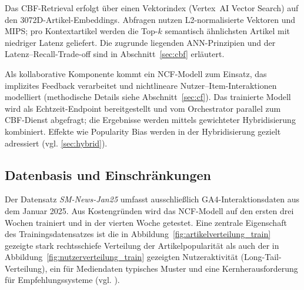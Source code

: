 \label{sec:cbf_service}
Das \ac{CBF}-Retrieval erfolgt über einen Vektorindex (Vertex~AI Vector Search) auf den 
3072D-Artikel-Embeddings. Abfragen nutzen L2-normalisierte Vektoren und \ac{MIPS}; 
pro Kontextartikel werden die Top-$k$ semantisch ähnlichsten Artikel mit niedriger Latenz 
geliefert. Die zugrunde liegenden \ac{ANN}-Prinzipien und der Latenz–Recall-Trade-off 
sind in Abschnitt~\ref{sec:cbf} erläutert.

\label{sec:ncf_service}
Als kollaborative Komponente kommt ein \ac{NCF}-Modell zum Einsatz, 
das implizites Feedback verarbeitet und nichtlineare 
Nutzer–Item-Interaktionen modelliert (methodische Details siehe Abschnitt~\ref{sec:cf}). 
Das trainierte Modell wird als Echtzeit-Endpoint bereitgestellt und vom 
Orchestrator parallel zum \ac{CBF}-Dienst abgefragt; die Ergebnisse werden mittels 
gewichteter Hybridisierung kombiniert. Effekte wie Popularity Bias werden in der 
Hybridisierung gezielt adressiert (vgl. \ref{sec:hybrid}).

\subsection{Datenbasis und Einschränkungen}
\label{sec:data}
Der Datensatz \textit{SM-News-Jan25} umfasst ausschließlich \ac{GA4}-Interaktionsdaten aus dem Januar 2025. 
Aus Kostengründen wird das NCF-Modell auf den ersten drei Wochen trainiert und in der vierten Woche getestet. 
Eine zentrale Eigenschaft des Trainingsdatensatzes ist die in Abbildung~\ref{fig:artikelverteilung_train} gezeigte stark 
rechtsschiefe Verteilung der Artikelpopularität als auch der in Abbildung~\ref{fig:nutzerverteilung_train}
gezeigten Nutzeraktivität (Long-Tail-Verteilung), ein für Mediendaten typisches Muster und eine Kernherausforderung für 
Empfehlungssysteme (vgl. \cite{wu_personalized_2022, raza_news_2020}).


